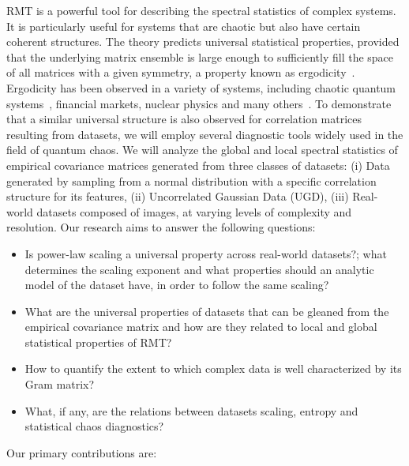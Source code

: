 \documentclass{article}
\begin{document}
RMT is a powerful tool for describing the spectral statistics of complex systems. It is particularly useful for systems that are chaotic but also have certain coherent structures. The theory predicts universal statistical properties, provided that the underlying matrix ensemble is large enough to sufficiently fill the space of all matrices with a given symmetry, a property known as ergodicity~\citep{Guhr_1998}. Ergodicity has been observed in a variety of systems, including chaotic quantum systems~\citep{bohigas1984characterization,mehta1991random,pandey1983random}, financial markets, nuclear physics and many others~\citep{plerou1999random,brody1981random,efetov1997supersymmetry}. 
To demonstrate that a similar universal structure is also observed for correlation matrices resulting from datasets, we will employ several diagnostic tools widely used in the field of quantum chaos. We will analyze the global and local spectral statistics of empirical covariance matrices generated from three classes of datasets: (i) Data generated by sampling from a normal distribution with a specific correlation structure for its features, (ii) Uncorrelated Gaussian Data (UGD), (iii) Real-world datasets composed of images, at varying levels of complexity and resolution.
Our research aims to answer the following questions:
\setlength{\leftmargini}{16pt}
\begin{itemize} \raggedright
    \item Is power-law scaling a universal property across real-world datasets?; 
    what determines the scaling exponent and
    what properties should an analytic model of the dataset have, in order to follow the same scaling? 
    \item 
    What are the universal properties of datasets that can be gleaned from the empirical covariance matrix and how are they related to local and global  statistical properties of RMT?
    \item 
    How to quantify the extent to which complex data is well characterized by its Gram matrix?
    \item What, if any, are the relations between datasets scaling, entropy and statistical chaos diagnostics?
\end{itemize}
Our primary contributions are:
\end{document}
